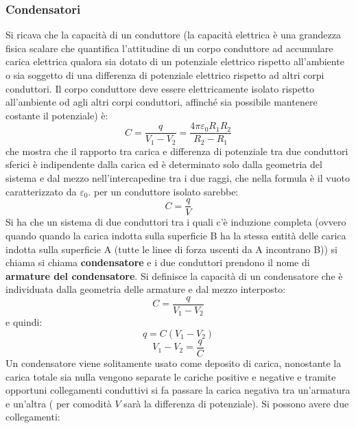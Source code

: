 \documentclass[a4paper,12pt, oneside]{book}
\begin{document}
\subsubsection{Condensatori}
Si ricava che la capacità di un conduttore (la capacità elettrica è una grandezza fisica scalare che quantifica l'attitudine di un corpo conduttore ad accumulare carica elettrica qualora sia dotato di un potenziale elettrico rispetto all'ambiente o sia soggetto di una differenza di potenziale elettrico rispetto ad altri corpi conduttori.  Il corpo conduttore deve essere elettricamente isolato rispetto all'ambiente od agli altri corpi conduttori, affinché sia possibile mantenere costante il potenziale) è:
$$C=\frac{q}{V_1-V_2}=\frac{4\pi\varepsilon_0R_1R_2}{R_2-R_1}$$
che mostra che il rapporto tra carica e differenza di potenziale tra due conduttori sferici è indipendente dalla carica ed è determinato solo dalla geometria del sistema e dal mezzo nell'intercapedine tra i due raggi, che nella formula è il vuoto caratterizzato da $\varepsilon_0$. 
per un conduttore isolato sarebbe:
$$C=\frac{q}{V}$$
Si ha che un sistema di due conduttori tra i quali c'è induzione completa (ovvero quando quando la carica indotta sulla superficie B ha la stessa entità delle carica indotta sulla superficie A (tutte le linee di forza uscenti da A incontrano B)) si chiama si chiama \textbf{condensatore} e i due conduttori prendono il nome di \textbf{armature del condensatore}. Si definisce la capacità di un condensatore che è individuata dalla geometria delle armature e dal mezzo interposto:
$$C=\frac{q}{V_1-V_2}$$
e quindi:
$$q=C(V_1-V_2)$$
$$V_1-V_2=\frac{q}{C}$$
Un condensatore viene solitamente usato come deposito di carica, nonostante la carica totale sia nulla vengono separate le cariche positive e negative e tramite opportuni collegamenti conduttivi si fa passare la carica negativa tra un'armatura e un'altra ( per comodità $V$ sarà la differenza di potenziale). Si possono avere due collegamenti:
\end{document}
